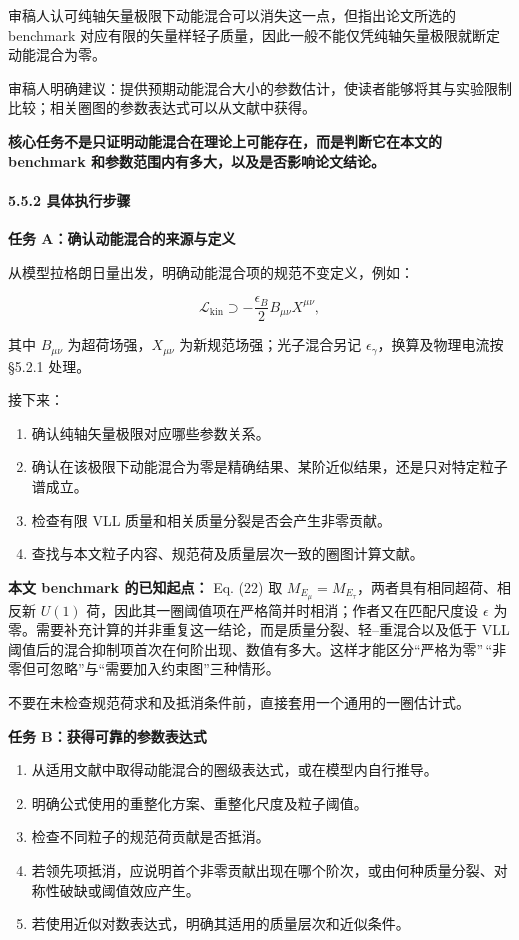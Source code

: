 \documentclass[
  chinese,
  UTF8]{ctexart}
\providecommand{\tightlist}{%
  \setlength{\itemsep}{0pt}\setlength{\parskip}{0pt}}
\begin{document}
审稿人认可纯轴矢量极限下动能混合可以消失这一点，但指出论文所选的
benchmark
对应有限的矢量样轻子质量，因此一般不能仅凭纯轴矢量极限就断定动能混合为零。

审稿人明确建议：提供预期动能混合大小的参数估计，使读者能够将其与实验限制比较；相关圈图的参数表达式可以从文献中获得。

\textbf{核心任务不是只证明动能混合在理论上可能存在，而是判断它在本文的
benchmark 和参数范围内有多大，以及是否影响论文结论。}

\paragraph{5.5.2
具体执行步骤}\label{ux5177ux4f53ux6267ux884cux6b65ux9aa4-1}

\textbf{任务 A：确认动能混合的来源与定义}

从模型拉格朗日量出发，明确动能混合项的规范不变定义，例如：

\[
\mathcal L_{\mathrm{kin}}
\supset
-\frac{\epsilon_B}{2}B_{\mu\nu}X^{\mu\nu},
\]

其中 \(B_{\mu\nu}\) 为超荷场强，\(X_{\mu\nu}\)
为新规范场强；光子混合另记 \(\epsilon_\gamma\)，换算及物理电流按 §5.2.1
处理。

接下来：

\begin{enumerate}
\def\labelenumi{\arabic{enumi}.}
\tightlist
\item
  确认纯轴矢量极限对应哪些参数关系。
\item
  确认在该极限下动能混合为零是精确结果、某阶近似结果，还是只对特定粒子谱成立。
\item
  检查有限 VLL 质量和相关质量分裂是否会产生非零贡献。
\item
  查找与本文粒子内容、规范荷及质量层次一致的圈图计算文献。
\end{enumerate}

\textbf{本文 benchmark 的已知起点：} Eq. (22) 取
\(M_{E_\mu}=M_{E_\tau}\)，两者具有相同超荷、相反新 \(U(1)\)
荷，因此其一圈阈值项在严格简并时相消；作者又在匹配尺度设 \(\epsilon\)
为零。需要补充计算的并非重复这一结论，而是质量分裂、轻--重混合以及低于
VLL
阈值后的混合抑制项首次在何阶出现、数值有多大。这样才能区分``严格为零''\,``非零但可忽略''与``需要加入约束图''三种情形。

不要在未检查规范荷求和及抵消条件前，直接套用一个通用的一圈估计式。

\textbf{任务 B：获得可靠的参数表达式}

\begin{enumerate}
\def\labelenumi{\arabic{enumi}.}
\tightlist
\item
  从适用文献中取得动能混合的圈级表达式，或在模型内自行推导。
\item
  明确公式使用的重整化方案、重整化尺度及粒子阈值。
\item
  检查不同粒子的规范荷贡献是否抵消。
\item
  若领先项抵消，应说明首个非零贡献出现在哪个阶次，或由何种质量分裂、对称性破缺或阈值效应产生。
\item
  若使用近似对数表达式，明确其适用的质量层次和近似条件。
\end{enumerate}
\end{document}
